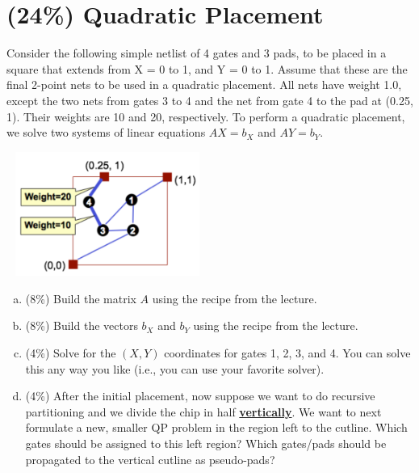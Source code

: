 \documentclass[12pt]{article}
\begin{document}
    \section{(24\%) Quadratic Placement}

        Consider the following simple netlist of 4 gates and 3 pads, to be placed in a square
        that extends from X = 0 to 1, and Y = 0 to 1. Assume that these are the final 2-point
        nets to be used in a quadratic placement. All nets have weight 1.0, except the two
        nets from gates 3 to 4 and the net from gate 4 to the pad at (0.25, 1). Their weights
        are 10 and 20, respectively. To perform a quadratic placement, we solve two systems
        of linear equations $AX=b_X$ and $AY=b_Y$.

        \begin{center}
            \includegraphics[width = 2.60in, height = 1.60in]{figure2.png}
        \end{center}

        \begin{enumerate}[(a)]
            \item (8\%) Build the matrix $A$ using the recipe from the lecture.
            \item (8\%) Build the vectors $b_X$ and $b_Y$ using the recipe from the lecture.
            \item (4\%) Solve for the $(X, Y)$ coordinates for gates 1, 2, 3, and 4. You can
                solve this any way you like (i.e., you can use your favorite solver).
            \item (4\%) After the initial placement, now suppose we want to do recursive
                partitioning and we divide the chip in half \textbf{\underline{vertically}}.
                We want to next formulate a new, smaller QP problem in the region left to the
                cutline. Which gates should be assigned to this left region? Which gates/pads
                should be propagated to the vertical cutline as pseudo-pads?
        \end{enumerate}
\end{document}
